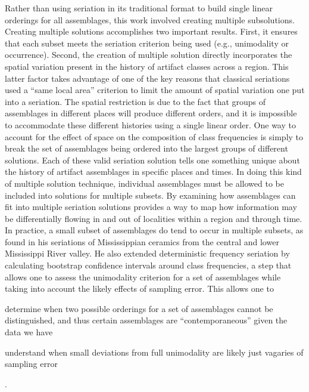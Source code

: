 Rather than using seriation in its traditional format to build single linear orderings for all assemblages, this work involved creating multiple subsolutions.  Creating multiple solutions accomplishes two important results. First, it ensures that each subset meets the seriation criterion being used (e.g., unimodality or occurrence). Second, the creation of multiple solution directly incorporates the spatial variation present in the history of artifact classes across a region. This latter factor takes advantage of one of the key reasons that classical seriations used a “same local area” criterion to limit the amount of spatial variation one put into a seriation.  The spatial restriction is due to the fact that groups of assemblages in different places will produce different orders, and it is impossible to accommodate these different histories using a single linear order.  One way to account for the effect of space on the composition of class frequencies is simply to break the set of assemblages being ordered into the largest groups of different solutions. Each of these valid seriation solution tells one something unique about the history of artifact assemblages in specific places and times. In doing this kind of multiple solution technique, individual assemblages must be allowed to be included into solutions for multiple subsets. By examining how assemblages can fit into multiple seriation solutions provides a way to map how information may be differentially flowing in and out of localities within a region and through time. In practice, a small subset of assemblages do tend to occur in multiple subsets, as \citet{Lipo2001} found in his seriations of Mississippian ceramics from the central and lower Mississippi River  valley.  He also extended deterministic frequency seriation by calculating bootstrap confidence intervals around class frequencies, a step that allows one to assess the unimodality criterion for a set of assemblages while taking into account the likely effects of sampling error.  This allows one to \begin{dissparalist}
\item determine when two possible orderings for a set of assemblages cannot be distinguished, and thus certain assemblages are ``contemporaneous'' given the data we have
\item understand when small deviations from full unimodality are likely just vagaries of sampling error
\end{dissparalist}.

